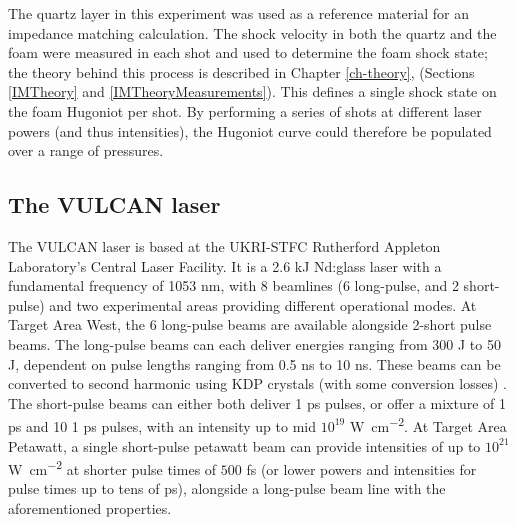 The quartz layer in this experiment was used as a reference material for an impedance matching calculation. The shock velocity in both the quartz and the foam were measured in each shot and used to determine the foam shock state; the theory behind this process is described in Chapter \ref{ch-theory}, (Sections \ref{IMTheory} and \ref{IMTheoryMeasurements}). This defines a single shock state on the foam Hugoniot per shot. By performing a series of shots at different laser powers (and thus intensities), the Hugoniot curve could therefore be populated over a range of pressures.

\subsection{The VULCAN laser}

The VULCAN laser is based at the UKRI-STFC Rutherford Appleton Laboratory's Central Laser Facility. It is a 2.6 kJ Nd:glass laser with a fundamental frequency of 1053 \unit{\nano\meter}, with 8 beamlines (6 long-pulse, and 2 short-pulse) and two experimental areas providing different operational modes. At Target Area West, the 6 long-pulse beams are available alongside 2-short pulse beams. The long-pulse beams can each deliver energies ranging from 300 \unit{\joule} to 50 \unit{\joule}, dependent on pulse lengths ranging from 0.5 \unit{\nano\second} to 10 \unit{\nano\second}. These beams can be converted to second harmonic using KDP crystals (with some conversion losses) \cite{Ross1981}. The short-pulse beams can either both deliver 1 \unit{\pico\second} pulses, or offer a mixture of 1 \unit{\pico\second} and 10 1 \unit{\pico\second} pulses, with an intensity up to mid $10^{19}$ \unit{\watt\per\centi\meter\squared}. At Target Area Petawatt, a single short-pulse petawatt beam can provide intensities of up to $10^{21}$ \unit{\watt\per\centi\meter\squared} at shorter pulse times of $500$ \unit{\femto\second} (or lower powers and intensities for pulse times up to tens of \unit{\pico\second}), alongside a long-pulse beam line with the aforementioned properties.

